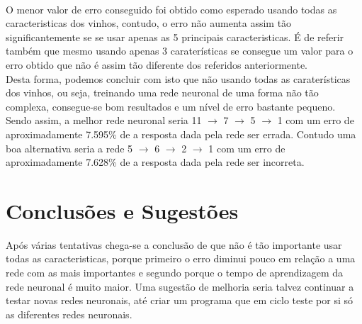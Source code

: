 \documentclass{article}
\begin{document}
\\
O menor valor de erro conseguido foi obtido como esperado usando todas as caracteristicas dos vinhos, contudo, o erro não aumenta assim tão significantemente se se usar apenas as 5 principais caracteristicas. É de referir também que mesmo usando apenas 3 caraterísticas se consegue um valor para o erro obtido que não é assim tão diferente dos referidos anteriormente.\\
Desta forma, podemos concluir com isto que não usando todas as caraterísticas dos vinhos, ou seja, treinando uma rede neuronal de uma forma não tão complexa, consegue-se bom resultados e um nível de erro bastante pequeno.
Sendo assim, a melhor rede neuronal seria 11 $\to$ 7 $\to$ 5 $\to$ 1 com um erro de aproximadamente 7.595\% de a resposta dada pela rede ser errada. Contudo uma boa alternativa seria a rede 5 $\to$ 6 $\to$ 2 $\to$ 1 com um erro de aproximadamente 7.628\% de a resposta dada pela rede ser incorreta.

\newpage

\vspace*{\fill}
\section{Conclusões e Sugestões}
Após várias tentativas chega-se a conclusão de que não é tão importante usar todas as caracteristicas, porque primeiro o erro diminui pouco em relação a uma rede com as mais importantes e segundo porque o tempo de aprendizagem da rede neuronal é muito maior. Uma sugestão de melhoria seria talvez continuar a testar novas redes neuronais, até criar um programa que em ciclo teste por si só as diferentes redes neuronais.
\vspace*{\fill}
\end{document}
